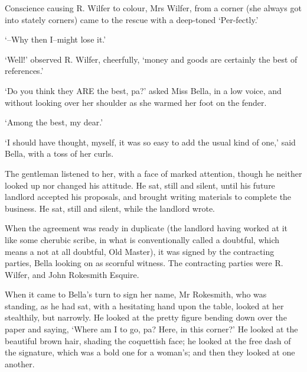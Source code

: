 Conscience causing R. Wilfer to colour, Mrs Wilfer, from a corner (she
always got into stately corners) came to the rescue with a deep-toned
‘Per-fectly.’

‘--Why then I--might lose it.’

‘Well!’ observed R. Wilfer, cheerfully, ‘money and goods are certainly
the best of references.’

‘Do you think they ARE the best, pa?’ asked Miss Bella, in a low voice,
and without looking over her shoulder as she warmed her foot on the
fender.

‘Among the best, my dear.’

‘I should have thought, myself, it was so easy to add the usual kind of
one,’ said Bella, with a toss of her curls.

The gentleman listened to her, with a face of marked attention, though
he neither looked up nor changed his attitude. He sat, still and silent,
until his future landlord accepted his proposals, and brought writing
materials to complete the business. He sat, still and silent, while the
landlord wrote.

When the agreement was ready in duplicate (the landlord having worked
at it like some cherubic scribe, in what is conventionally called a
doubtful, which means a not at all doubtful, Old Master), it was signed
by the contracting parties, Bella looking on as scornful witness. The
contracting parties were R. Wilfer, and John Rokesmith Esquire.

When it came to Bella’s turn to sign her name, Mr Rokesmith, who was
standing, as he had sat, with a hesitating hand upon the table, looked
at her stealthily, but narrowly. He looked at the pretty figure bending
down over the paper and saying, ‘Where am I to go, pa? Here, in this
corner?’ He looked at the beautiful brown hair, shading the coquettish
face; he looked at the free dash of the signature, which was a bold one
for a woman’s; and then they looked at one another.

